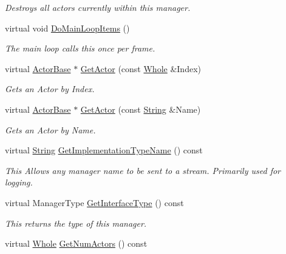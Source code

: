 \begin{DoxyCompactItemize}
\begin{DoxyCompactList}\small\item\em Destroys all actors currently within this manager. \end{DoxyCompactList}\item 
virtual void \hyperlink{classMezzanine_1_1ActorManager_a8b1907afd4804047c03ff4bb51c89caa}{Do\-Main\-Loop\-Items} ()
\begin{DoxyCompactList}\small\item\em The main loop calls this once per frame.  \end{DoxyCompactList}\item 
virtual \hyperlink{classMezzanine_1_1ActorBase}{Actor\-Base} $\ast$ \hyperlink{classMezzanine_1_1ActorManager_a71e61da8caf365ae03dd85090245b1ae}{Get\-Actor} (const \hyperlink{namespaceMezzanine_adcbb6ce6d1eb4379d109e51171e2e493}{Whole} \&Index)
\begin{DoxyCompactList}\small\item\em Gets an Actor by Index. \end{DoxyCompactList}\item 
virtual \hyperlink{classMezzanine_1_1ActorBase}{Actor\-Base} $\ast$ \hyperlink{classMezzanine_1_1ActorManager_a9657cdc7c0cef46a172ad73f366e4199}{Get\-Actor} (const \hyperlink{namespaceMezzanine_acf9fcc130e6ebf08e3d8491aebcf1c86}{String} \&Name)
\begin{DoxyCompactList}\small\item\em Gets an Actor by Name. \end{DoxyCompactList}\item 
virtual \hyperlink{namespaceMezzanine_acf9fcc130e6ebf08e3d8491aebcf1c86}{String} \hyperlink{classMezzanine_1_1ActorManager_ab7af48b21ac3abd5363aec10393b268c}{Get\-Implementation\-Type\-Name} () const 
\begin{DoxyCompactList}\small\item\em This Allows any manager name to be sent to a stream. Primarily used for logging.  \end{DoxyCompactList}\item 
virtual Manager\-Type \hyperlink{classMezzanine_1_1ActorManager_ae118a3f023985b35c1da32210c0b4ea2}{Get\-Interface\-Type} () const 
\begin{DoxyCompactList}\small\item\em This returns the type of this manager.  \end{DoxyCompactList}\item 
virtual \hyperlink{namespaceMezzanine_adcbb6ce6d1eb4379d109e51171e2e493}{Whole} \hyperlink{classMezzanine_1_1ActorManager_ab5bee94dfa8c103b2bb9ace4f9ab20fc}{Get\-Num\-Actors} () const 

\end{DoxyCompactItemize}
